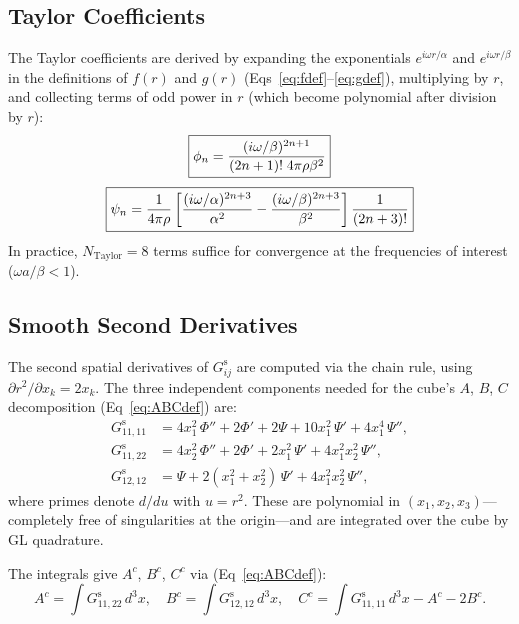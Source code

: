 \subsection{Taylor Coefficients}

The Taylor coefficients are derived by expanding the exponentials
$e^{i\omega r/\alpha}$ and $e^{i\omega r/\beta}$ in the definitions of
$f(r)$ and $g(r)$ (Eqs~\ref{eq:fdef}--\ref{eq:gdef}), multiplying by $r$, and collecting terms of
odd power in $r$ (which become polynomial after division by $r$):
\begin{equation}
  \boxed{%
    \phi_n = \frac{(i\omega/\beta)^{2n+1}}{(2n+1)!\;4\pi\rho\beta^2}
  }
\end{equation}
\begin{equation}
  \boxed{%
    \psi_n = \frac{1}{4\pi\rho}
    \left[
      \frac{(i\omega/\alpha)^{2n+3}}{\alpha^2}
      - \frac{(i\omega/\beta)^{2n+3}}{\beta^2}
    \right]
    \frac{1}{(2n+3)!}
  }
\end{equation}
In practice, $N_{\text{Taylor}} = 8$ terms suffice for convergence at the
frequencies of interest ($\omega a/\beta < 1$).

\subsection{Smooth Second Derivatives}

The second spatial derivatives of $G_{ij}^{\mathrm{s}}$ are computed via the
chain rule, using $\partial r^2/\partial x_k = 2x_k$.  The three independent
components needed for the cube's $A$, $B$, $C$ decomposition (Eq~\ref{eq:ABCdef}) are:
\begin{align}
  G_{11,11}^{\mathrm{s}}
    &= 4x_1^2\,\Phi'' + 2\Phi' + 2\Psi + 10x_1^2\,\Psi'
       + 4x_1^4\,\Psi'',
  \\
  G_{11,22}^{\mathrm{s}}
    &= 4x_2^2\,\Phi'' + 2\Phi' + 2x_1^2\,\Psi'
       + 4x_1^2 x_2^2\,\Psi'',
  \\
  G_{12,12}^{\mathrm{s}}
    &= \Psi + 2(x_1^2 + x_2^2)\,\Psi'
       + 4x_1^2 x_2^2\,\Psi'',
\end{align}
where primes denote $d/du$ with $u = r^2$.  These are polynomial in
$(x_1, x_2, x_3)$---completely free of singularities at the
origin---and are integrated over the cube by GL quadrature.

The integrals give $A^c$, $B^c$, $C^c$ via (Eq~\ref{eq:ABCdef}):
\begin{equation}
  A^c = \int G_{11,22}^{\mathrm{s}}\,d^3x, \quad
  B^c = \int G_{12,12}^{\mathrm{s}}\,d^3x, \quad
  C^c = \int G_{11,11}^{\mathrm{s}}\,d^3x - A^c - 2B^c.
\end{equation}


